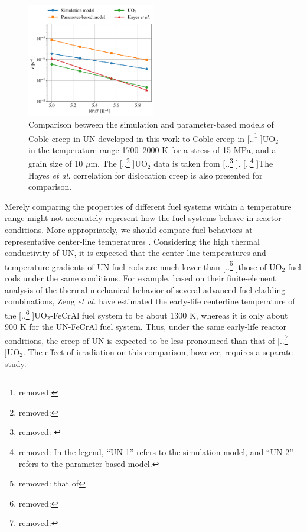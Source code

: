 \documentclass[preprint,12pt,sort&compress]{elsarticle} %
\newcommand{\?}{\stackrel{?}{=}}
\providecommand{\DIFaddtex}[1]{{\sf #1}} %
\providecommand{\DIFdeltex}[1]{{[..\footnote{removed: #1} ]}} %
\providecommand{\DIFaddbegin}{\protect\color{blue}} %
\providecommand{\DIFaddend}{\protect\color{black}} %
\providecommand{\DIFdelbegin}{\protect\color{red}} %
\providecommand{\DIFdelend}{\protect\color{black}} %
\providecommand{\DIFaddFL}[1]{\DIFadd{#1}} %
\providecommand{\DIFdelFL}[1]{\DIFdel{#1}} %
\providecommand{\DIFaddbeginFL}{} %
\providecommand{\DIFaddendFL}{} %
\providecommand{\DIFdelbeginFL}{} %
\providecommand{\DIFdelendFL}{} %
\providecommand{\DIFadd}[1]{\texorpdfstring{\DIFaddtex{#1}}{#1}} %
\providecommand{\DIFdel}[1]{\texorpdfstring{\DIFdeltex{#1}}{}} %
\newcommand{\DIFscaledelfig}{0.5}
\newlength{\DIFdelgraphicswidth} %
\newlength{\DIFdelgraphicsheight} %
\newcommand{\DIFaddincludegraphics}[2][]{{\color{blue}\fbox{\DIFOincludegraphics[#1]{#2}}}} %
\newcommand{\DIFdelincludegraphics}[2][]{%
\sbox{\DIFdelgraphicsbox}{\DIFOincludegraphics[#1]{#2}}%
\settoboxwidth{\DIFdelgraphicswidth}{\DIFdelgraphicsbox} %
\settoboxtotalheight{\DIFdelgraphicsheight}{\DIFdelgraphicsbox} %
\scalebox{\DIFscaledelfig}{%
\parbox[b]{\DIFdelgraphicswidth}{\usebox{\DIFdelgraphicsbox}\\[-\baselineskip] \rule{\DIFdelgraphicswidth}{0em}}\llap{\resizebox{\DIFdelgraphicswidth}{\DIFdelgraphicsheight}{%
\setlength{\unitlength}{\DIFdelgraphicswidth}%
\begin{picture}(1,1)%
\thicklines\linethickness{2pt} %
{\color[rgb]{1,0,0}\put(0,0){\framebox(1,1){}}}%
{\color[rgb]{1,0,0}\put(0,0){\line( 1,1){1}}}%
{\color[rgb]{1,0,0}\put(0,1){\line(1,-1){1}}}%
\end{picture}%
}\hspace*{3pt}}} %
} %
\DeclareRobustCommand{\DIFaddbegin}{\DIFOaddbegin \let\includegraphics\DIFaddincludegraphics} %
\DeclareRobustCommand{\DIFaddend}{\DIFOaddend \let\includegraphics\DIFOincludegraphics} %
\DeclareRobustCommand{\DIFdelbegin}{\DIFOdelbegin \let\includegraphics\DIFdelincludegraphics} %
\DeclareRobustCommand{\DIFdelend}{\DIFOaddend \let\includegraphics\DIFOincludegraphics} %
\DeclareRobustCommand{\DIFaddbeginFL}{\DIFOaddbeginFL \let\includegraphics\DIFaddincludegraphics} %
\DeclareRobustCommand{\DIFaddendFL}{\DIFOaddendFL \let\includegraphics\DIFOincludegraphics} %
\DeclareRobustCommand{\DIFdelbeginFL}{\DIFOdelbeginFL \let\includegraphics\DIFdelincludegraphics} %
\DeclareRobustCommand{\DIFdelendFL}{\DIFOaddendFL \let\includegraphics\DIFOincludegraphics} %
\begin{document}
\DIFdelbegin %

\DIFdelend \begin{figure}[h!]
    \centering
    \includegraphics[width=0.5\textwidth]{UNvsUO2.png}
    \caption{Comparison between the simulation and parameter-based models of Coble creep in UN developed in this work to Coble creep in \DIFdelbeginFL \DIFdelFL{ }\DIFdelendFL \DIFaddbeginFL \DIFaddFL{UO$_2$ }\DIFaddendFL in the temperature range 1700--2000 K for a stress of 15 MPa, and a grain size of 10 $\mu$m. The \DIFdelbeginFL \DIFdelFL{ }\DIFdelendFL \DIFaddbeginFL \DIFaddFL{UO$_2$ }\DIFaddendFL data is taken from \DIFdelbeginFL \DIFdelFL{\cite{Galvin2024b}}\DIFdelendFL \DIFaddbeginFL \DIFaddFL{\cite{Galvin2025}}\DIFaddendFL . \DIFdelbeginFL \DIFdelFL{In the legend, ``UN 1'' refers to the simulation model, and ``UN 2'' refers to the parameter-based model. }\DIFdelendFL The Hayes \textit{et al.} \cite{Hayes1990II} correlation for dislocation creep is also presented for comparison.}
    \label{Fig:UNvsUO2}
\end{figure}

Merely comparing the properties of different fuel systems within a temperature range might not accurately represent how the fuel systems behave in reactor conditions. More appropriately, we should compare fuel behaviors at representative center-line temperatures \cite{Cheniour2020}. Considering the high thermal conductivity of UN, it is expected that the center-line temperatures and temperature gradients of UN fuel rods are much lower than \DIFdelbegin \DIFdel{that of  }\DIFdelend \DIFaddbegin \DIFadd{those of UO$_2$ }\DIFaddend fuel rods under the same conditions. For example, based on their finite-element analysis of the thermal-mechanical behavior of several advanced fuel-cladding combinations, Zeng \textit{et al.} \cite{Zeng2021} have estimated the early-life centerline temperature of the \DIFdelbegin \DIFdel{}\DIFdelend \DIFaddbegin \DIFadd{UO$_2$}\DIFaddend -FeCrAl fuel system to be about 1300 K, whereas it is only about 900 K for the UN-FeCrAl fuel system. Thus, under the same early-life reactor conditions, the creep of UN is expected to be less pronounced than that of \DIFdelbegin \DIFdel{}\DIFdelend \DIFaddbegin \DIFadd{UO$_2$}\DIFaddend . The effect of irradiation on this comparison, however, requires a separate study.
\end{document}
